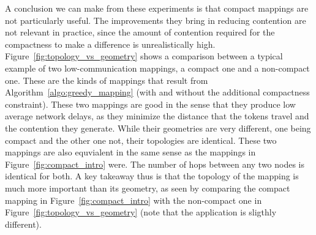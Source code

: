 A conclusion we can make from these experiments is that compact mappings are not particularly useful. 
The improvements they bring in reducing contention are not relevant in practice, since the amount of contention required for the compactness to make a difference is unrealistically high.
Figure~\ref{fig:topology_vs_geometry} shows a comparison between a typical example of two low-communication mappings, a compact one and a non-compact one. 
These are the kinds of mappings that result from Algorithm~\ref{algo:greedy_mapping} (with and without the additional compactness constraint).
These two mappings are good in the sense that they produce low average network delays, as they minimize the distance that the tokens travel and the contention they generate.
While their geometries are very different, one being compact and the other one not, their topologies are identical. These two mappings are also equvialent in the same sense as the mappings in Figure~\ref{fig:compact_intro} were.
The number of hops between any two nodes is identical for both.
A key takeaway thus is that the topology of the mapping is much more important than its geometry, as seen by comparing the compact mapping in Figure~\ref{fig:compact_intro} with the non-compact one in Figure~\ref{fig:topology_vs_geometry} (note that the application is sligthly different).